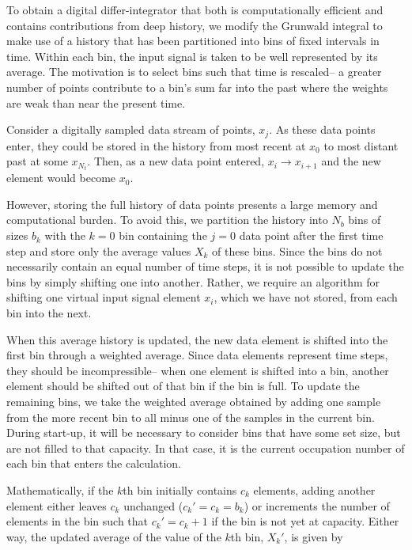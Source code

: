 

To obtain a digital differ-integrator that both is computationally efficient and contains contributions from deep history, we modify the Grunwald integral to make use of a history that has been partitioned into bins of fixed intervals in time. Within each bin, the input signal is taken to be well represented by its average. The motivation is to select bins such that time is rescaled-- a greater number of points contribute to a bin's sum far into the past where the weights are weak than near the present time.  

Consider a digitally sampled data stream of points, $x_j$. As these data points enter, they could be stored in the history from most recent at $x_0$ to most distant past at some $x_{N_t}$.  Then, as a new data point entered, $x_i\rightarrow x_{i+1}$ and the new element would become $x_0$. 

However, storing the full history of data points presents a large memory and computational burden. To avoid this, we partition the history into $N_b$ bins of sizes $b_k$ with the $k=0$ bin containing the $j=0$ data point after the first time step and store only the average values $X_k$ of these bins. Since the bins do not necessarily contain an equal number of time steps, it is not possible to update the bins by simply shifting one into another. Rather, we require an algorithm for shifting one virtual input signal element $x_i$, which we have not stored, from each bin into the next. 

When this average history is updated, the new data element is shifted into the first bin through a weighted average. Since data elements represent time steps, they should be incompressible-- when one element is shifted into a bin, another element should be shifted out of that bin if the bin is full. To update the remaining bins, we take the weighted average obtained by adding one sample from the more recent bin to all minus one of the samples in the current bin. During start-up, it will be necessary to consider bins that have some set size, but are not filled to that capacity. In that case, it is the current occupation number of each bin that enters the calculation. 


Mathematically,  if the $k$th bin initially contains $c_k$
elements, adding another element either leaves $c_k$ unchanged
($c_k\prime=c_k=b_k$) or increments the number of elements in the bin such
that $c_k\prime = c_k + 1$ if the bin is not yet at capacity. Either way, the updated average of the
value of the $k$th bin, $X_k\prime$, is given by


